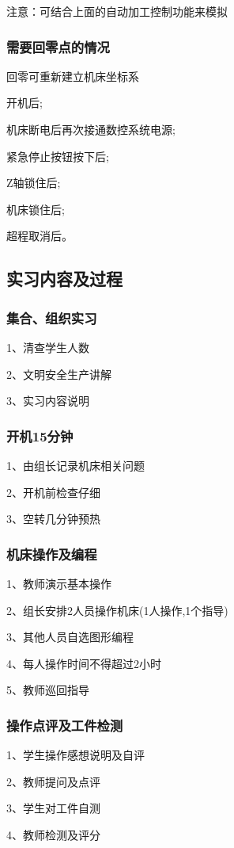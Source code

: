 注意：可结合上面的自动加工控制功能来模拟


\subsubsection{需要回零点的情况}
回零可重新建立机床坐标系
\begin{compactenum}[1、]
\item 开机后;
\item 机床断电后再次接通数控系统电源;
\item 紧急停止按钮按下后;
\item Z轴锁住后;
\item 机床锁住后;
\item 超程取消后。
\end{compactenum}

\subsection{实习内容及过程}

\subsubsection{集合、组织实习}
1、清查学生人数

2、文明安全生产讲解

3、实习内容说明
\subsubsection{开机15分钟}
1、由组长记录机床相关问题

2、开机前检查仔细

3、空转几分钟预热
\subsubsection{机床操作及编程}
1、教师演示基本操作

2、组长安排2人员操作机床(1人操作,1个指导)

3、其他人员自选图形编程

4、每人操作时间不得超过2小时

5、教师巡回指导
\subsubsection{操作点评及工件检测}
1、学生操作感想说明及自评

2、教师提问及点评

3、学生对工件自测

4、教师检测及评分
